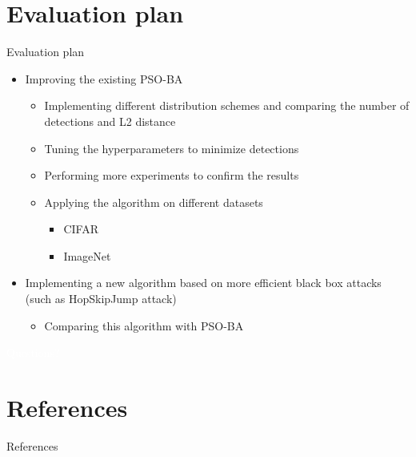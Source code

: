 \documentclass[11pt,t]{beamer}
\begin{document}
\section{Evaluation plan}
\begin{frame}{Evaluation plan}
\begin{itemize}
	\item Improving the existing PSO-BA
	\begin{itemize}
		\item Implementing different distribution schemes and comparing the number of detections and L2 distance
		\item Tuning the hyperparameters to minimize detections
		\item Performing more experiments to confirm the results
		\item Applying the algorithm on different datasets
		\begin{itemize}
			\item CIFAR
			\item ImageNet
		\end{itemize}
	\end{itemize}
	\item Implementing a new algorithm based on more efficient black box attacks (such as HopSkipJump attack)
	\begin{itemize}
		\item Comparing this algorithm with PSO-BA
	\end{itemize}
\end{itemize}
\end{frame}

\begin{frame}

\centering
\textcolor{white}{Questions?}
\end{frame}

\appendix
\section*{References}
\begin{frame}[allowframebreaks]{References}


\end{frame}
\end{document}
